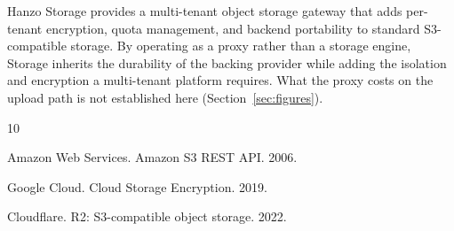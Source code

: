 \documentclass[11pt,twocolumn]{article}
\begin{document}
Hanzo Storage provides a multi-tenant object storage gateway that adds per-tenant encryption, quota management, and backend portability to standard S3-compatible storage. By operating as a proxy rather than a storage engine, Storage inherits the durability of the backing provider while adding the isolation and encryption a multi-tenant platform requires. What the proxy costs on the upload path is not established here (Section~\ref{sec:figures}).


\begin{thebibliography}{10}

Amazon Web Services. Amazon S3 REST API. 2006.

Google Cloud. Cloud Storage Encryption. 2019.

Cloudflare. R2: S3-compatible object storage. 2022.

\end{thebibliography}
\end{document}
